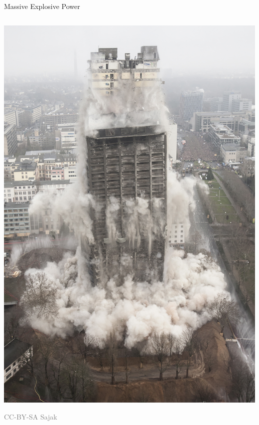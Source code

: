\documentclass[presentation]{beamer}
\begin{document}
\begin{frame}[label=sec-1-6]{Massive Explosive Power}
\begin{columns}
\begin{column}{0.38\textwidth}
\begin{varblock}[0.95\textwidth]{}
\includegraphics[width=\textwidth]{images/140202_Afe-Tower_Blasting.jpg}
\end{varblock}
\vspace{-0.3cm}
\tiny \textcolor{gray}{CC-BY-SA Sajak}
\end{column}
\end{columns}
\end{frame}
\end{document}
